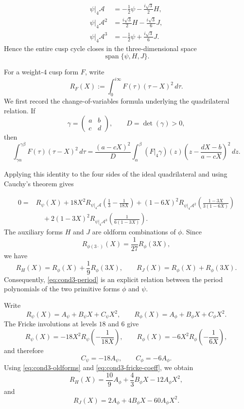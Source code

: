 \documentclass[preprint,12pt]{elsarticle}
\theoremstyle{definition}
\theoremstyle{remark}
\begin{document}
\begin{align}
	\psi|_4\mathcal A
	&=
	-\frac{1}{2}\psi-\frac{i\sqrt{3}}{2}H,
	\label{eq:cond3-A1}\\
	\psi|_4\mathcal A^2
	&=
	\frac{i\sqrt{3}}{2}H-\frac{i\sqrt{3}}{6}J,
	\label{eq:cond3-A2}\\
	\psi|_4\mathcal A^3
	&=
	-\frac{1}{2}\psi+\frac{i\sqrt{3}}{6}J.
	\label{eq:cond3-A3}
\end{align}
Hence the entire cusp cycle closes in the three-dimensional space
\[
\operatorname{span}\{\psi,H,J\}.
\]

For a weight-$4$ cusp form $F$, write
\[
R_F(X):=\int_0^{i\infty}F(\tau)(\tau-X)^2\,d\tau.
\]
We first record the change-of-variables formula underlying the quadrilateral relation.  If
\[
\gamma=
\begin{pmatrix}
	a&b\\
	c&d
\end{pmatrix},
\qquad D=\det(\gamma)>0,
\]
then
\[
\int_{\gamma\alpha}^{\gamma\beta}
F(\tau)(\tau-X)^2\,d\tau
=
\frac{(a-cX)^2}{D}
\int_\alpha^\beta
(F|_4\gamma)(z)
\left(
z-\frac{dX-b}{a-cX}
\right)^2\,dz.
\]



Applying this identity to the four sides of the ideal quadrilateral and using
Cauchy's theorem gives



\begin{equation}\label{eq:cond3-period}
	\begin{aligned}
		0={}&R_\psi(X)
		+18X^2R_{\psi|_4\mathcal A}
		\left(\frac{1}{3}-\frac{1}{18X}\right)
		+(1-6X)^2R_{\psi|_4\mathcal A^2}
		\left(\frac{1-3X}{3(1-6X)}\right)\\
		&\quad
		+2(1-3X)^2R_{\psi|_4\mathcal A^3}
		\left(\frac{1}{6(1-3X)}\right).
	\end{aligned}
\end{equation}
The auxiliary forms $H$ and $J$ are oldform combinations of $\phi$.  Since
\[
R_{\phi(3\cdot)}(X)=\frac{1}{27}R_\phi(3X),
\]
we have
\begin{equation}\label{eq:cond3-oldforms}
	R_H(X)=R_\phi(X)+\frac{1}{9}R_\phi(3X),
	\qquad
	R_J(X)=R_\phi(X)+R_\phi(3X).
\end{equation}
Consequently, \eqref{eq:cond3-period} is an explicit relation between the period polynomials of the two primitive forms $\phi$ and $\psi$.

Write
\[
R_\psi(X)=A_\psi+B_\psi X+C_\psi X^2,
\qquad
R_\phi(X)=A_\phi+B_\phi X+C_\phi X^2.
\]
The Fricke involutions at levels $18$ and $6$ give
\[
R_\psi(X)=-18X^2R_\psi\left(-\frac{1}{18X}\right),
\qquad
R_\phi(X)=-6X^2R_\phi\left(-\frac{1}{6X}\right),
\]
and therefore
\begin{equation}\label{eq:cond3-fricke-coeff}
	C_\psi=-18A_\psi,
	\qquad
	C_\phi=-6A_\phi.
\end{equation}
Using \eqref{eq:cond3-oldforms} and \eqref{eq:cond3-fricke-coeff}, we obtain
\[
R_H(X)
=
\frac{10}{9}A_\phi+\frac{4}{3}B_\phi X-12A_\phi X^2,
\]
and
\[
R_J(X)
=
2A_\phi+4B_\phi X-60A_\phi X^2.
\]
\end{document}

